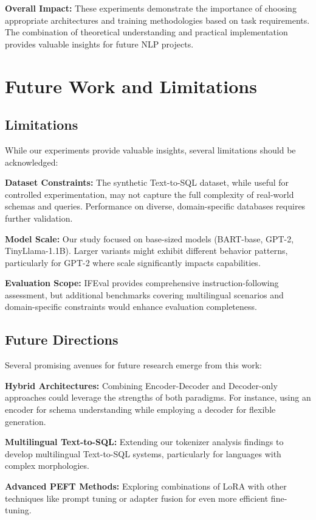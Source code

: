 \documentclass[conference]{IEEEtran}
\begin{document}
\textbf{Overall Impact:} These experiments demonstrate the importance of choosing appropriate architectures and training methodologies based on task requirements. The combination of theoretical understanding and practical implementation provides valuable insights for future NLP projects.

\section{Future Work and Limitations}

\subsection{Limitations}
While our experiments provide valuable insights, several limitations should be acknowledged:

\textbf{Dataset Constraints:} The synthetic Text-to-SQL dataset, while useful for controlled experimentation, may not capture the full complexity of real-world schemas and queries. Performance on diverse, domain-specific databases requires further validation.

\textbf{Model Scale:} Our study focused on base-sized models (BART-base, GPT-2, TinyLlama-1.1B). Larger variants might exhibit different behavior patterns, particularly for GPT-2 where scale significantly impacts capabilities.

\textbf{Evaluation Scope:} IFEval provides comprehensive instruction-following assessment, but additional benchmarks covering multilingual scenarios and domain-specific constraints would enhance evaluation completeness.

\subsection{Future Directions}
Several promising avenues for future research emerge from this work:

\textbf{Hybrid Architectures:} Combining Encoder-Decoder and Decoder-only approaches could leverage the strengths of both paradigms. For instance, using an encoder for schema understanding while employing a decoder for flexible generation.

\textbf{Multilingual Text-to-SQL:} Extending our tokenizer analysis findings to develop multilingual Text-to-SQL systems, particularly for languages with complex morphologies.

\textbf{Advanced PEFT Methods:} Exploring combinations of LoRA with other techniques like prompt tuning or adapter fusion for even more efficient fine-tuning.
\end{document}
